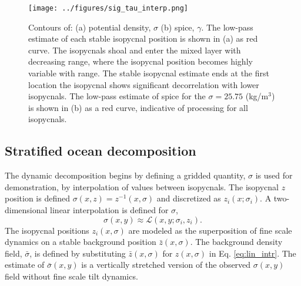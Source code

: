\documentclass[preprint,NumberedRefs]{JASA}
\begin{document}
\begin{figure}
\texttt{[image: ../figures/sig\_tau\_interp.png]}
    \caption{\label{fig:cntrs}{Contours of: (a) potential density, $\sigma$ (b) spice, $\gamma$. The low-pass estimate of each stable isopycnal position is shown in (a) as red curve. The isopycnals shoal and enter the mixed layer with decreasing range, where the isopycnal position becomes highly variable with range. The stable isopycnal estimate ends at the first location the isopycnal shows significant decorrelation with lower isopycnals. The low-pass estimate of spice for the $\sigma=25.75$ (kg/m$^3$) is shown in (b) as a red curve, indicative of processing for all isopycnals.}}
\end{figure}

\subsection{Stratified ocean decomposition}


The dynamic decomposition begins by defining a gridded quantity, $\sigma$ is used for demonstration, by interpolation of values between isopycnals. The isopycnal $z$ position is defined $\sigma(x, z) = z^{-1}(x, \sigma)$ and discretized as $z_i(x; \sigma_i)$. A two-dimensional linear interpolation is defined for $\sigma$,
\begin{equation}
    \sigma(x,y)\approx\mathcal{L}(x, y; \sigma_i, z_i).
    \label{eq:lin_intr}
\end{equation}
The isopycnal positions $z_i(x, \sigma)$ are modeled as the superposition of fine scale dynamics on a stable background position $\bar{z}(x, \sigma)$. The background density field, $\bar{\sigma}$, is defined by substituting $\bar{z}(x, \sigma)$ for $z(x, \sigma)$ in Eq. \eqref{eq:lin_intr}. The estimate of $\bar{\sigma}(x,y)$ is a vertically stretched version of the observed $\sigma(x,y)$ field without fine scale tilt dynamics.
\end{document}
